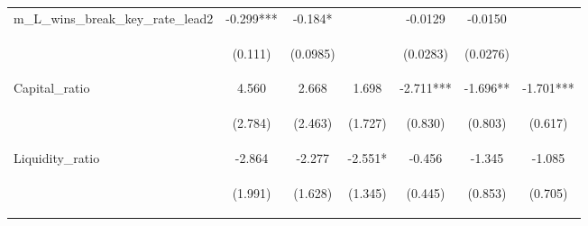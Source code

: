 \begin{tabular}{lcccccc}
m\_L\_wins\_break\_key\_rate\_lead2 & -0.299*** & -0.184* &  & -0.0129 & -0.0150 &  \\
\vspace{4pt} & \begin{footnotesize}(0.111)\end{footnotesize} & \begin{footnotesize}(0.0985)\end{footnotesize} & \begin{footnotesize}\end{footnotesize} & \begin{footnotesize}(0.0283)\end{footnotesize} & \begin{footnotesize}(0.0276)\end{footnotesize} & \begin{footnotesize}\end{footnotesize} \\
Capital\_ratio & 4.560 & 2.668 & 1.698 & -2.711*** & -1.696** & -1.701*** \\
\vspace{4pt} & \begin{footnotesize}(2.784)\end{footnotesize} & \begin{footnotesize}(2.463)\end{footnotesize} & \begin{footnotesize}(1.727)\end{footnotesize} & \begin{footnotesize}(0.830)\end{footnotesize} & \begin{footnotesize}(0.803)\end{footnotesize} & \begin{footnotesize}(0.617)\end{footnotesize} \\
Liquidity\_ratio & -2.864 & -2.277 & -2.551* & -0.456 & -1.345 & -1.085 \\
\vspace{4pt} & \begin{footnotesize}(1.991)\end{footnotesize} & \begin{footnotesize}(1.628)\end{footnotesize} & \begin{footnotesize}(1.345)\end{footnotesize} & \begin{footnotesize}(0.445)\end{footnotesize} & \begin{footnotesize}(0.853)\end{footnotesize} & \begin{footnotesize}(0.705)\end{footnotesize} \\

\end{tabular}
